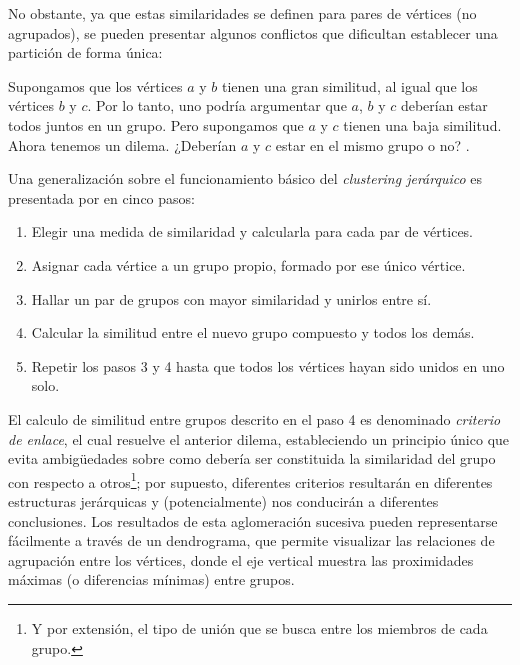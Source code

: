 \documentclass[letterpaper, 11pt]{book}
\theoremstyle{definition}
\theoremstyle{remark}
\begin{document}
No obstante, ya que estas similaridades se definen para pares de vértices (no agrupados), se pueden presentar algunos conflictos que dificultan establecer una partición de forma única: 

\begin{center}
    \begin{minipage}{0.9\linewidth}
        {\setlength{\parindent}{12pt}\small
         Supongamos que los vértices $a$ y $b$ tienen una gran similitud, al igual que los vértices $b$ y $c$. 
         Por lo tanto, uno podría argumentar que $a$, $b$ y $c$ deberían estar todos juntos en un grupo. 
         Pero supongamos que $a$ y $c$ tienen una baja similitud. 
         Ahora tenemos un dilema. ¿Deberían $a$ y $c$ estar en el mismo grupo o no?
         \normalsize \citep[381]{2010_Newman_Networks}.
        }
    \end{minipage}
\end{center}


Una generalización sobre el funcionamiento básico del \emph{clustering jerárquico} es presentada por \citet{2010_Newman_Networks} en cinco pasos:
\vspace{-0.5em}
\begin{enumerate}
    \setlength\itemsep{0em}
    \item Elegir una medida de similaridad y calcularla para cada par de vértices. 
    \item Asignar cada vértice a un grupo propio, formado por ese único vértice. 
    \item Hallar un par de grupos con mayor similaridad y unirlos entre sí.
    \item Calcular la similitud entre el nuevo grupo compuesto y todos los demás. 
    \item Repetir los pasos 3 y 4 hasta que todos los vértices hayan sido unidos en uno solo. 
\end{enumerate}

El calculo de similitud entre grupos descrito en el paso 4 es denominado \emph{criterio de enlace}, el cual resuelve el anterior dilema, estableciendo un principio único que evita ambigüedades sobre como debería ser constituida la similaridad del grupo con respecto a otros\footnote{
    Y por extensión, el tipo de unión que se busca entre los miembros de cada grupo. 
}; por supuesto, diferentes criterios resultarán en diferentes estructuras jerárquicas y (potencialmente) nos conducirán a diferentes conclusiones. 
Los resultados de esta aglomeración sucesiva pueden representarse fácilmente a través de un dendrograma, que permite visualizar las relaciones de agrupación entre los vértices, donde el eje vertical muestra las proximidades máximas (o diferencias mínimas) entre grupos. 
\end{document}
